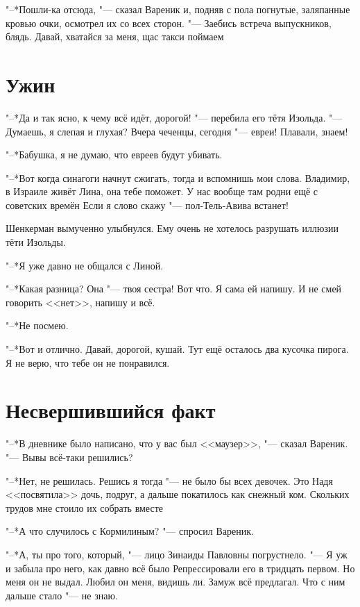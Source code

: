 "--*Пошли-ка отсюда, "--- сказал Вареник и, подняв с пола погнутые, заляпанные кровью очки, осмотрел их со всех сторон.
"--- Заебись встреча выпускников, блядь.
Давай, хватайся за меня, щас такси поймаем\ldotst

\section{Ужин}

"--*Да и так ясно, к чему всё идёт, дорогой! "--- перебила его тётя Изольда.
"--- Думаешь, я слепая и глухая?
Вчера чеченцы, сегодня "--- евреи!
Плавали, знаем!

"--*Бабушка, я не думаю, что евреев будут убивать.

"--*Вот когда синагоги начнут сжигать, тогда и вспомнишь мои слова.
Владимир, в Израиле живёт Лина, она тебе поможет.
У нас вообще там родни ещё с советских времён\ldotse
Если я слово скажу "--- пол-Тель-Авива встанет!

Шенкерман вымученно улыбнулся.
Ему очень не хотелось разрушать иллюзии тёти Изольды.

"--*Я уже давно не общался с Линой.

"--*Какая разница?
Она "--- твоя сестра!
Вот что.
Я сама ей напишу.
И не смей говорить <<нет>>, напишу и всё.

"--*Не посмею.

"--*Вот и отлично.
Давай, дорогой, кушай.
Тут ещё осталось два кусочка пирога.
Я не верю, что тебе он не понравился.

\section{Несвершившийся факт}

"--*В дневнике было написано, что у вас был <<маузер>>, "--- сказал Вареник.
"--- Вы\ldotst вы всё-таки решились?

"--*Нет, не решилась.
Решись я тогда "--- не было бы всех девочек.
Это Надя <<посвятила>> дочь, подруг, а дальше покатилось как снежный ком.
Скольких трудов мне стоило их собрать вместе\ldotst

"--*А что случилось с Кормилиным? "--- спросил Вареник.

"--*А, ты про того, который, "--- лицо Зинаиды Павловны погрустнело.
"--- Я уж и забыла про него, как давно всё было\ldotst
Репрессировали его в тридцать первом.
Но меня он не выдал.
Любил он меня, видишь ли.
Замуж всё предлагал.
Что с ним дальше стало "--- не знаю.

